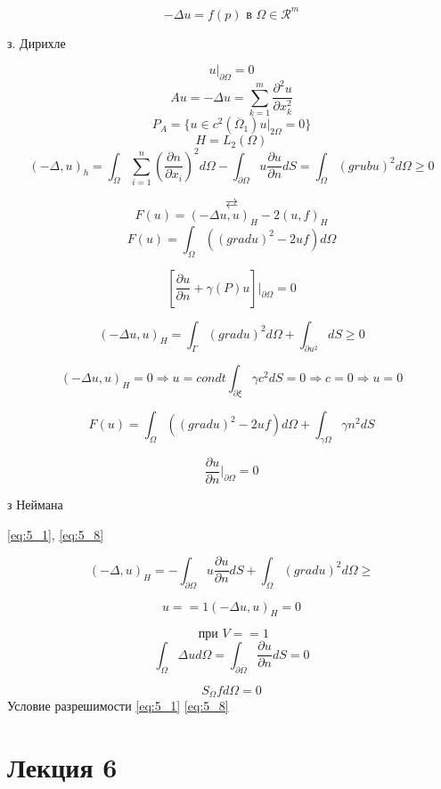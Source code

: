 \documentclass[12pt, a4paper]{article}
\begin{document}
\[ -\Delta u = f(p) \textrm{ в } \Omega \in \mathcal{R}^m \]\label{eq:5_1}

з. Дирихле

\[ u|_{\partial \Omega} = 0 \]\label{eq:5_2}
\[ A u = - \Delta u = \sum_{k=1}^{m } \frac{\partial^2 u }{\partial x_k^2} \]
\[ P_A = \{ u \in c^2 (\overline{\Omega}_1) u |_{2 \Omega} = 0 \} \]
\[ H = L_2 (\Omega) \]
\[ (- \Delta, u )_h = \int_{\Omega}^{} \sum_{i=1}^{n} (\frac{\partial n }{\partial x_i})^2 d \Omega - \int_{ \partial \Omega}^{} u \frac{\partial u }{\partial n } dS = \int_{\Omega}^{} {({grub} u)}^2 d\Omega \geq 0 \]\label{eq:5_3}

\[  \rightleftarrows \]
\[ F(u) = (-\Delta u, u )_H -2(u, f)_H  \]\label{eq:5_4}
\[ F(u) = \int_{\Omega }^{} ((grad u )^2 - 2uf) d\Omega  \]\label{eq:5_5}

\[ [\frac{\partial u }{\partial n} + \gamma (P) u ] |_{\partial \Omega} = 0 \]\label{eq:5_6}

\[ (- \Delta u, u)_H = \int_{\Gamma}^{} (grad u)^2 d\Omega + \int_{\partial u^2}^{} dS \geq 0 \]

\[ (-\Delta u, u)_H =0 \Rightarrow u = condt \int_{ \partial \xi}^{} \gamma c^2 dS = 0 \Rightarrow c = 0 \Rightarrow u= 0\]

\[ F(u) = \int_{\Omega}^{} ((grad u)^2 - 2uf) d\Omega + \int_{\gamma \Omega} \gamma n^2 dS \]\label{eq:5_7}

\[ \frac{\partial u }{\partial n}|_{\partial \Omega } = 0 \]\label{eq:5_8}

з Неймана

\ref{eq:5_1}, \ref{eq:5_8} 

\[ (- \Delta, u )_H = - \int_{\partial \Omega}^{} u  \frac{\partial u}{\partial n} dS + \int_{\Omega}^{} (grad u )^2 d\Omega \geq \]

\[ u == 1 (- \Delta u, u)_H = 0 \]

\[ \textrm{ при  } V == 1 \]
\[ \int_{\Omega }^{} \Delta u d\Omega = \int_{\partial \overline{\Omega}}^{} \frac{\partial u }{\partial n } dS = 0 \]

\[ S_{\Omega} f d \Omega = 0\]
Условие разрешимости \ref{eq:5_1} \ref{eq:5_8}

\section{Лекция 6}
\end{document}
